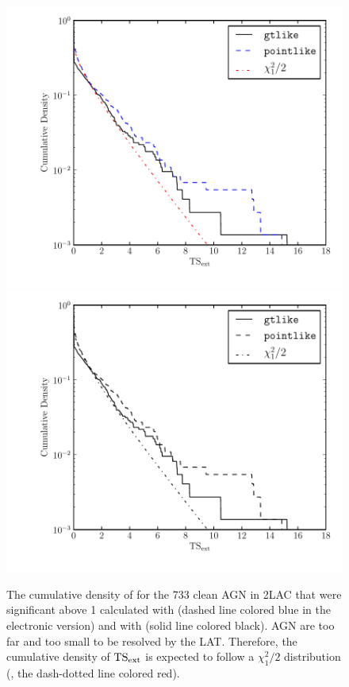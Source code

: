 \clearpage
\begin{figure}
    \ifcolorfigure
      \includegraphics{source_plots/agn_color.pdf}
    \else
      \includegraphics{source_plots/agn_bw.pdf}
    \fi
    \caption{The cumulative density of \tsext for the 733 clean
    AGN in 2LAC that were significant above 1 \gev calculated with \pointlike (dashed line
    colored blue in the electronic version)
    and with \gtlike (solid line colored black).  AGN are too far
    and too small to be resolved by the LAT. Therefore, the cumulative
    density of $\mathrm{TS}_\mathrm{ext}$ is expected to follow a $\chi^2_1/2$ distribution
    (, the dash-dotted line colored
    red).
    }
  \end{figure}


